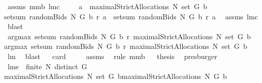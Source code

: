\begin{isabellebody}
%
\isadelimproof
%
\endisadelimproof
%
\isatagproof
{}\isamarkupfalse%
\ assms\ mm{}{}b\ lm{}{}c\ \isanewline
{}\isamarkupfalse%
\ {\isacharminus}\isanewline
{}\isamarkupfalse%
\ {\isachardoublequoteopen}{\isasymforall}\ a\ {\isasymin}\ maximalStrictAllocations{\isacharprime}\ N\ {\isacharparenleft}set\ G{\isacharparenright}\ b{\isachardot}\ \isanewline
setsum\ {\isacharparenleft}randomBids{\isacharprime}\ N\ G\ b\ r{\isacharparenright}\ a\ {\isacharequal}\ setsum\ {\isacharparenleft}randomBids\ N\ G\ b\ r{\isacharparenright}\ a{\isachardoublequoteclose}\ \isamarkupfalse%
\ assms{\isacharparenleft}{}{\isacharcomma}{}{\isacharparenright}\ lm{}{}c\ \isamarkupfalse%
\ blast\isanewline
{}\isamarkupfalse%
\ \isamarkupfalse%
\ {\isachardoublequoteopen}argmax\ {\isacharparenleft}setsum\ {\isacharparenleft}randomBids\ N\ G\ b\ r{\isacharparenright}{\isacharparenright}\ {\isacharparenleft}maximalStrictAllocations{\isacharprime}\ N\ {\isacharparenleft}set\ G{\isacharparenright}\ b{\isacharparenright}\ {\isacharequal}\isanewline
argmax\ {\isacharparenleft}setsum\ {\isacharparenleft}randomBids{\isacharprime}\ N\ G\ b\ r{\isacharparenright}{\isacharparenright}\ {\isacharparenleft}maximalStrictAllocations{\isacharprime}\ N\ {\isacharparenleft}set\ G{\isacharparenright}\ b{\isacharparenright}{\isachardoublequoteclose}\ \isamarkupfalse%
\ lm{}{}\ \isamarkupfalse%
\ blast\isanewline
{}\isamarkupfalse%
\ \isamarkupfalse%
\ {\isachardoublequoteopen}card\ {\isachardot}{\isachardot}{\isachardot}\ {\isacharequal}\ {}{\isachardoublequoteclose}\ \isamarkupfalse%
\ assms\ \isamarkupfalse%
\ {\isacharparenleft}rule\ mm{}{}b{\isacharparenright}\isanewline
{}\isamarkupfalse%
\ \isamarkupfalse%
\ {\isacharquery}thesis\ \isamarkupfalse%
\ presburger\isanewline
{}\isamarkupfalse%
%
\endisatagproof
{\isafoldproof}%
%
\isadelimproof
\isanewline
%
\endisadelimproof
{}\isamarkupfalse%
\ lm{}{}e{\isacharcolon}\ \ {\isachardoublequoteopen}finite\ N{\isachardoublequoteclose}\ {\isachardoublequoteopen}distinct\ G{\isachardoublequoteclose}\ \isanewline
{\isachardoublequoteopen}maximalStrictAllocations{\isacharprime}\ N\ {\isacharparenleft}set\ G{\isacharparenright}\ b{\isacharequal}maximalStrictAllocations\ N\ G\ b{\isachardoublequoteclose}\ \isanewline

\end{isabellebody}
